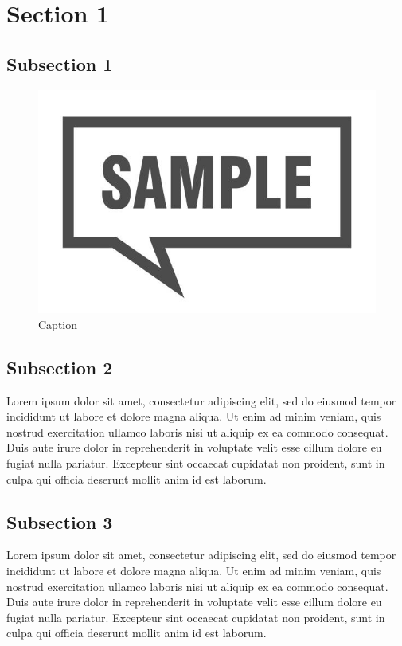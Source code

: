 
\section{Section 1}

\subsection{Subsection 1}
\begin{figure}[th]
	\centering
	\includegraphics{tex/img/stock.jpg}
	\caption{Caption}
	\label{stock}
\end{figure}
\clearpage

\subsection{Subsection 2}
Lorem ipsum dolor sit amet, consectetur adipiscing elit, sed do eiusmod tempor incididunt ut labore et dolore magna aliqua. Ut enim ad minim veniam, quis nostrud exercitation ullamco laboris nisi ut aliquip ex ea commodo consequat. Duis aute irure dolor in reprehenderit in voluptate velit esse cillum dolore eu fugiat nulla pariatur. Excepteur sint occaecat cupidatat non proident, sunt in culpa qui officia deserunt mollit anim id est laborum.
\clearpage

\subsection{Subsection 3}
Lorem ipsum dolor sit amet, consectetur adipiscing elit, sed do eiusmod tempor incididunt ut labore et dolore magna aliqua. Ut enim ad minim veniam, quis nostrud exercitation ullamco laboris nisi ut aliquip ex ea commodo consequat. Duis aute irure dolor in reprehenderit in voluptate velit esse cillum dolore eu fugiat nulla pariatur. Excepteur sint occaecat cupidatat non proident, sunt in culpa qui officia deserunt mollit anim id est laborum.
\clearpage
